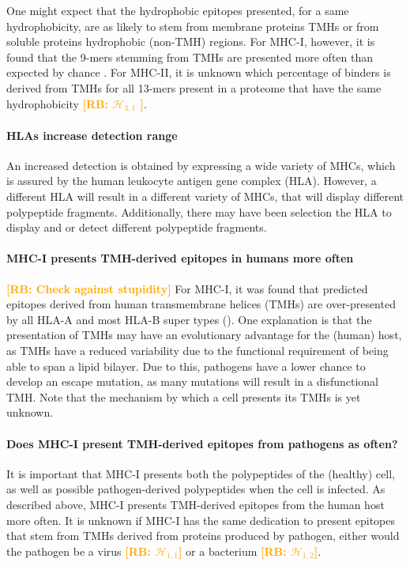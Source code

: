 \documentclass{article}
\newcommand{\richel}[1]{\textcolor{orange}{\textbf{[RB: #1]}}}
\begin{document}
One might expect that the hydrophobic epitopes presented,
for a same hydrophobicity, are as likely to stem from 
membrane proteins TMHs or from soluble proteins hydrophobic (non-TMH) regions.
For MHC-I, however, it is found that the 9-mers stemming
from TMHs are presented more often than expected by chance \cite{bianchi2017}.
For MHC-II, it is unknown which percentage of binders 
is derived from TMHs for all 13-mers present in a proteome
that have the same hydrophobicity 
\richel{
  $\mathcal{H}_{3,1}$
}.

\paragraph{HLAs increase detection range}

An increased detection
is obtained by expressing a wide variety of
MHCs, which is assured by the human leukocyte antigen gene complex (HLA).
However, a different HLA will result in a different variety of MHCs,
that will display different polypeptide fragments. Additionally, there
may have been selection the HLA to display and or detect different
polypeptide fragments.

\paragraph{MHC-I presents TMH-derived epitopes in humans more often}

\richel{Check against stupidity}
For MHC-I, it was found that predicted epitopes derived 
from human transmembrane helices (TMHs)
are over-presented by all HLA-A and 
most HLA-B super types (\cite{bianchi2017}). 
One explanation is that the presentation of TMHs 
may have an evolutionary advantage for 
the (human) host, as TMHs have a reduced variability 
due to the functional requirement of being able to span a lipid 
bilayer. 
Due to this, pathogens have a lower chance to develop an escape mutation,
as many mutations will result in a disfunctional TMH.
Note that the mechanism by which a cell presents its TMHs is
yet unknown.

\paragraph{Does MHC-I present TMH-derived epitopes from pathogens as often?}

It is important that MHC-I presents both the polypeptides of the 
(healthy) cell, as well as possible pathogen-derived polypeptides when the
cell is infected. As described above, MHC-I presents TMH-derived epitopes 
from the human host more often. It is unknown if MHC-I has the same
dedication to present epitopes that stem from TMHs derived from
proteins produced by pathogen, either would the pathogen
be a virus \richel{$\mathcal{H}_{1,1}$} or 
a bacterium \richel{$\mathcal{H}_{1,2}$}.
\end{document}
